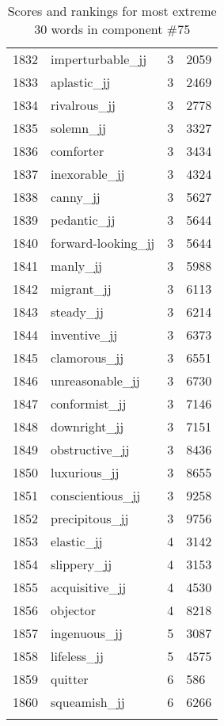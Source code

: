 \begin{longtable}[!htbp]{| rlr@{.}l |}
    1832 & imperturbable\_jj & 3 & 2059 \\
    1833 & aplastic\_jj & 3 & 2469 \\
    1834 & rivalrous\_jj & 3 & 2778 \\
    1835 & solemn\_jj & 3 & 3327 \\
    1836 & comforter & 3 & 3434 \\
    1837 & inexorable\_jj & 3 & 4324 \\
    1838 & canny\_jj & 3 & 5627 \\
    1839 & pedantic\_jj & 3 & 5644 \\
    1840 & forward-looking\_jj & 3 & 5644 \\
    1841 & manly\_jj & 3 & 5988 \\
    1842 & migrant\_jj & 3 & 6113 \\
    1843 & steady\_jj & 3 & 6214 \\
    1844 & inventive\_jj & 3 & 6373 \\
    1845 & clamorous\_jj & 3 & 6551 \\
    1846 & unreasonable\_jj & 3 & 6730 \\
    1847 & conformist\_jj & 3 & 7146 \\
    1848 & downright\_jj & 3 & 7151 \\
    1849 & obstructive\_jj & 3 & 8436 \\
    1850 & luxurious\_jj & 3 & 8655 \\
    1851 & conscientious\_jj & 3 & 9258 \\
    1852 & precipitous\_jj & 3 & 9756 \\
    1853 & elastic\_jj & 4 & 3142 \\
    1854 & slippery\_jj & 4 & 3153 \\
    1855 & acquisitive\_jj & 4 & 4530 \\
    1856 & objector & 4 & 8218 \\
    1857 & ingenuous\_jj & 5 & 3087 \\
    1858 & lifeless\_jj & 5 & 4575 \\
    1859 & quitter & 6 & 586 \\
    1860 & squeamish\_jj & 6 & 6266 \\
    \hline
    \caption{Scores and rankings for most extreme 30 words in component \#75} \\
\end{longtable}
